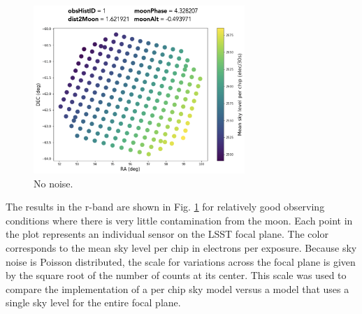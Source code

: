 \begin{figure}
\centering
\includegraphics[width=8cm]{images/sensors/skymodel1.jpg}
\caption{No noise.}
\label{fig:skymodel1}
\end{figure}

The results in the r-band are shown in Fig. \ref{fig:skymodel1} for relatively good observing conditions where there is very little contamination from the moon. Each point in the plot represents an individual sensor on the LSST focal plane. The color corresponds to the mean sky level per chip in electrons per exposure. Because sky noise is Poisson distributed, the scale for variations across the focal plane is given by the square root of the number of counts at its center. This scale was used to compare the implementation of a per chip sky model versus a model that uses a single sky level for the entire focal plane. 

